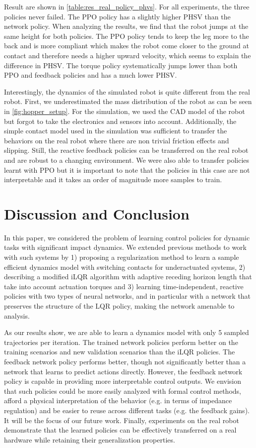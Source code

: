 Result are shown in \cref{table:res_real_policy_phvs}.
For all experiments, the three policies never failed. The PPO policy has a slightly higher PHSV than
the network policy. When analyzing the results, we find that the robot jumps at the same height for both policies. The PPO policy tends to keep the leg more to the back and is more compliant which makes the robot come closer to the ground at contact and therefore needs a higher upward velocity, which seems to explain the difference in PHSV.
The torque policy systematically jumps lower than both PPO and feedback policies and has a much lower PHSV.

Interestingly, the dynamics of the simulated robot is quite different from the real robot. First, we underestimated
the mass distribution of the robot as can be seen in  \cref{fig:hopper_setup}. For the simulation,
we used the CAD model of the robot but forgot to take the electronics and sensors into account. Additionally, the simple contact model used in the simulation was sufficient to transfer the behaviors on the real robot where there are non trivial friction effects and slipping.
Still, the reactive feedback policies can be
transferred on the real robot and are robust to a changing environment.
We were also able to transfer policies learnt with PPO but it is important to note that the policies in this case are not interpretable and it takes an order of magnitude more samples to train.
%
%
%
%
\section{Discussion and Conclusion}
\label{sec:conclusion_and_future_work}
In this paper, we considered the problem of learning control policies for dynamic tasks with significant impact
dynamics. We extended previous methods to work with such systems by 1) proposing a regularization method to learn a sample efficient dynamics model with switching contacts for underactuated systems,
2) describing a modified iLQR algorithm with adaptive receding horizon length that take into account actuation torques
and 3) learning time-independent, reactive policies with two types of neural networks, and in particular with a network that preserves the structure of the LQR policy, making the network amenable to analysis.

As our results show, we are able to learn a dynamics model with only 5 sampled trajectories per iteration. The trained network policies perform better on the training scenarios and new validation scenarios than the iLQR policies. The feedback network policy performs better, though not significantly better than a network that learns to predict actions directly. However, the feedback network policy is capable in providing more interpretable control outputs.  We envision that such policies could be more easily analyzed with formal control methods, afford a physical interpretation of the behavior (e.g. in terms of impedance regulation)
and be easier to reuse across different tasks (e.g. the feedback gains). It will be the focus of our future work. Finally, experiments on the real robot demonstrate that the learned policies can be effectively transferred on a real hardware while retaining their generalization properties.

